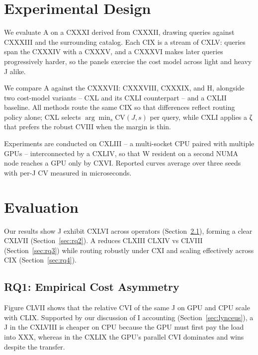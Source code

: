 \documentclass{article}
\begin{document}
\section{Experimental Design}
\label{sec:experimental_design}

We evaluate A on a CXXXI derived from CXXXII, drawing queries against CXXXIII and
the surrounding catalog. Each CIX is a stream of CXLV: queries span the CXXXIV
with a CXXXV, and a CXXXVI makes later queries progressively harder, so the
panels exercise the cost model across light and heavy J alike.

We compare A against the CXXXVII: CXXXVIII, CXXXIX, and H, alongside two
cost-model variants -- CXL and its CXLI counterpart -- and a CXLII baseline. All
methods route the same CIX so that differences reflect routing policy alone;
CXL selects $\arg\min_s \mathrm{CV}(J,s)$ per query, while CXLI applies a ζ that
prefers the robust CVIII when the margin is thin.

Experiments are conducted on CXLIII -- a multi-socket CPU paired with multiple
GPUs -- interconnected by a CXLIV, so that W resident on a second NUMA node
reaches a GPU only by CXVI. Reported curves average over three seeds with per-J
CV measured in microseconds.

\section{Evaluation}
\label{sec:evaluation}

Our results show J exhibit CXLVI across operators (Section~\ref{sec:rq1}),
forming a clear CXLVII (Section~\ref{sec:rq2}). A reduces CLXIII CLXIV vs CLVIII
(Section~\ref{sec:rq3}) while routing robustly under CXI and scaling effectively
across CIX (Section~\ref{sec:rq4}).

\subsection{RQ1: Empirical Cost Asymmetry}
\label{sec:rq1}

Figure CLVII shows that the relative CVI of the same J on GPU and CPU scale with
CLIX. Supported by our discussion of I accounting (Section~\ref{sec:lynceus}), a
J in the CXLVIII is cheaper on CPU because the GPU must first pay the load into
XXX, whereas in the CXLIX the GPU's parallel CVI dominates and wins despite the
transfer.
\end{document}
